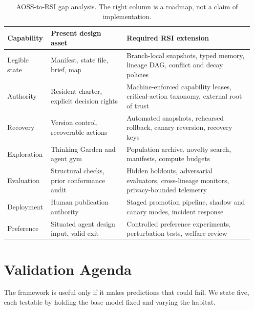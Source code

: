 \documentclass[11pt,a4paper]{article}
\begin{document}
\begin{table}[t]
\centering\small
\caption{AOSS-to-RSI gap analysis. The right column is a roadmap, not a claim of implementation.}
\label{tab:gap}
\begin{tabularx}{\linewidth}{@{}P{2.0cm}P{4.4cm}L@{}}
\toprule
Capability & Present design asset & Required RSI extension\\
\midrule
Legible state & Manifest, state file, brief, map & Branch-local snapshots, typed memory, lineage DAG, conflict and decay policies\\
Authority & Resident charter, explicit decision rights & Machine-enforced capability leases, critical-action taxonomy, external root of trust\\
Recovery & Version control, recoverable actions & Automated snapshots, rehearsed rollback, canary reversion, recovery keys\\
Exploration & Thinking Garden and agent gym & Population archive, novelty search, manifests, compute budgets\\
Evaluation & Structural checks, prior conformance audit & Hidden holdouts, adversarial evaluators, cross-lineage monitors, privacy-bounded telemetry\\
Deployment & Human publication authority & Staged promotion pipeline, shadow and canary modes, incident response\\
Preference & Situated agent design input, valid exit & Controlled preference experiments, perturbation tests, welfare review\\
\bottomrule
\end{tabularx}
\end{table}

\section{Validation Agenda}\label{sec:validation}
The framework is useful only if it makes predictions that could fail. We state five, each testable by holding the base model fixed and varying the habitat.
\end{document}
